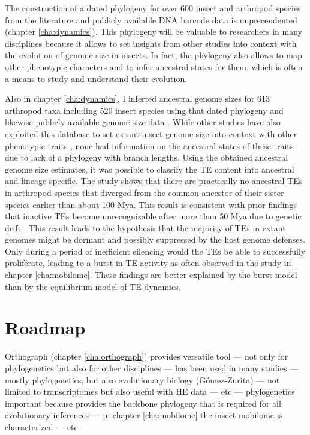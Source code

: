 The construction of a dated phylogeny for over 600 insect and arthropod
species from the literature and publicly available DNA barcode data is
unprecendented (chapter \ref{cha:dynamics}). This phylogeny will be
valuable to researchers in many disciplines because it allows to set
insights from other studies into context with the evolution of genome
size in insects.  In fact, the phylogeny also allows to map other
phenotypic characters and to infer ancestral states for them, which is
often a means to study and understand their evolution.

Also in chapter \ref{cha:dynamics}, I inferred ancestral genome sizes
for 613 arthropod taxa including 520 insect species using that dated
phylogeny and likewise publicly available genome size data
\citep{Gregory2018}. While other studies have also exploited this
database to set extant insect genome size into context with other
phenotypic traits \citep{Alfsnes2017, Gregory2011}, none had information
on the ancestral states of these traits due to lack of a phylogeny with
branch lengths. Using the obtained ancestral genome size estimates, it
was possible to classify the TE content into ancestral and
lineage-specific. The study shows that there are practically no
ancestral TEs in arthropod species that diverged from the common
ancestor of their sister species earlier than about 100 Mya. This result
is consistent with prior findings that inactive TEs become
unrecognizable after more than 50 Mya due to genetic drift
\citep{Shedlock2000}. This result leads to the hypothesis that the
majority of TEs in extant genomes might be dormant and possibly
suppressed by the host genome defenses. Only during a period of
inefficient silencing would the TEs be able to successfully proliferate,
leading to a burst in TE activity as often observed in the study in
chapter \ref{cha:mobilome}. These findings are better explained by the
burst model than by the equilibrium model of TE dynamics.

\section{Roadmap}

Orthograph (chapter \ref{cha:orthograph}) provides versatile tool ---
not only for phylogenetics but also for other disciplines --- has been
used in many studies --- mostly phylogenetics, but also evolutionary
biology (Gómez-Zurita) --- not limited to transcriptomes but also useful
with HE data --- etc --- phylogenetics important because provides the
backbone phylogeny that is required for all evolutionary inferences ---
in chapter \ref{cha:mobilome} the insect mobilome is characterized ---
etc
